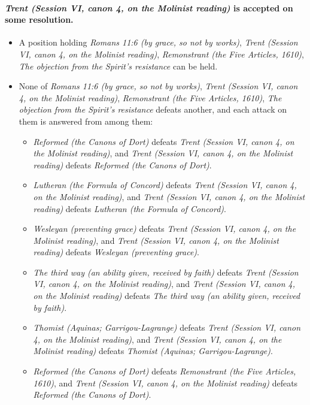 \documentclass[11pt]{article}
\begin{document}
\paragraph{\emph{Trent (Session VI, canon 4, on the Molinist reading)} is accepted on some resolution.}
\begin{itemize}
\item A position holding \emph{Romans 11:6 (by grace, so not by works)}, \emph{Trent (Session VI, canon 4, on the Molinist reading)}, \emph{Remonstrant (the Five Articles, 1610)}, \emph{The objection from the Spirit’s resistance} can be held.
\item None of \emph{Romans 11:6 (by grace, so not by works)}, \emph{Trent (Session VI, canon 4, on the Molinist reading)}, \emph{Remonstrant (the Five Articles, 1610)}, \emph{The objection from the Spirit’s resistance} defeats another, and each attack on them is answered from among them:
\begin{itemize}
\item \emph{Reformed (the Canons of Dort)} defeats \emph{Trent (Session VI, canon 4, on the Molinist reading)}, and \emph{Trent (Session VI, canon 4, on the Molinist reading)} defeats \emph{Reformed (the Canons of Dort)}.
\item \emph{Lutheran (the Formula of Concord)} defeats \emph{Trent (Session VI, canon 4, on the Molinist reading)}, and \emph{Trent (Session VI, canon 4, on the Molinist reading)} defeats \emph{Lutheran (the Formula of Concord)}.
\item \emph{Wesleyan (preventing grace)} defeats \emph{Trent (Session VI, canon 4, on the Molinist reading)}, and \emph{Trent (Session VI, canon 4, on the Molinist reading)} defeats \emph{Wesleyan (preventing grace)}.
\item \emph{The third way (an ability given, received by faith)} defeats \emph{Trent (Session VI, canon 4, on the Molinist reading)}, and \emph{Trent (Session VI, canon 4, on the Molinist reading)} defeats \emph{The third way (an ability given, received by faith)}.
\item \emph{Thomist (Aquinas; Garrigou-Lagrange)} defeats \emph{Trent (Session VI, canon 4, on the Molinist reading)}, and \emph{Trent (Session VI, canon 4, on the Molinist reading)} defeats \emph{Thomist (Aquinas; Garrigou-Lagrange)}.
\item \emph{Reformed (the Canons of Dort)} defeats \emph{Remonstrant (the Five Articles, 1610)}, and \emph{Trent (Session VI, canon 4, on the Molinist reading)} defeats \emph{Reformed (the Canons of Dort)}.

\end{itemize}
\end{itemize}
\end{document}
